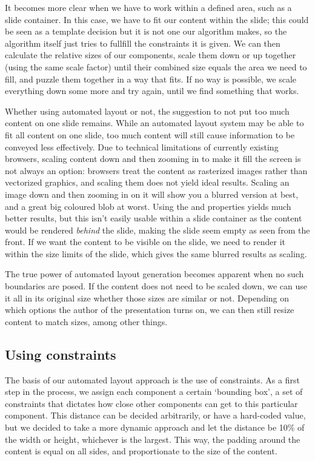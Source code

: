    It becomes more clear when we have to work within a defined area, such as a
   slide container. In this case, we have to fit our content within the slide;
   this could be seen as a template decision but it is not one our algorithm
   makes, so the algorithm itself just tries to fullfill the constraints it is
   given. We can then calculate the relative sizes of our components, scale
   them down or up together (using the same scale factor) until their combined
   size equals the area we need to fill, and puzzle them together in a way that
   fits. If no way is possible, we scale everything down some more and try
   again, until we find something that works.

   Whether using automated layout or not, the suggestion to not put too much
   content on one slide remains. While an automated layout system may be able
   to fit all content on one slide, too much content will still cause
   information to be conveyed less effectively. Due to technical limitations of
   currently existing browsers, scaling content down and then zooming in to
   make it fill the screen is not always an option: browsers treat the content
   as rasterized images rather than vectorized graphics, and scaling them does
   not yield ideal results. Scaling an image down and then zooming in on it
   will show you a blurred version at best, and a great big coloured blob at
   worst. Using the  and  properties
   yields much better results, but this isn't easily usable within a slide
   container as the content would be rendered \emph{behind} the slide, making
   the slide seem empty as seen from the front. If we want the content to be
   visible on the slide, we need to render it within the size limits of the
   slide, which gives the same blurred results as scaling.

   The true power of automated layout generation becomes apparent when no such
   boundaries are posed. If the content does not need to be scaled down, we can
   use it all in its original size whether those sizes are similar or not.
   Depending on which options the author of the presentation turns on, we can
   then still resize content to match sizes, among other things.

   \subsection{Using constraints}

    The basis of our automated layout approach is the use of constraints. As a
    first step in the process, we assign each component a certain `bounding
    box', a set of constraints that dictates how close other components can get
    to this particular component. This distance can be decided arbitrarily, or
    have a hard-coded value, but we decided to take a more dynamic approach and
    let the distance be 10\% of the width or height, whichever is the largest.
    This way, the padding around the content is equal on all sides, and
    proportionate to the size of the content.

